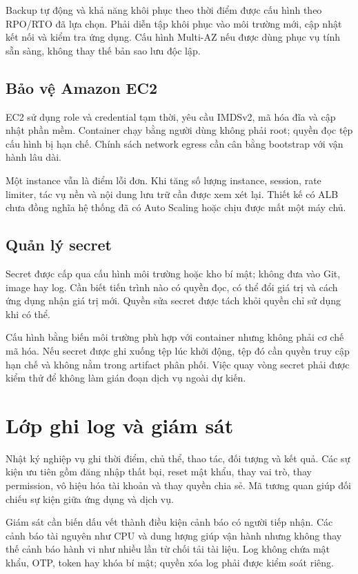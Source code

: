 Backup tự động và khả năng khôi phục theo thời điểm được cấu hình theo RPO/RTO đã lựa chọn. Phải diễn tập khôi phục vào môi trường mới, cập nhật kết nối và kiểm tra ứng dụng. Cấu hình Multi-AZ nếu được dùng phục vụ tính sẵn sàng, không thay thế bản sao lưu độc lập.
\subsection{Bảo vệ Amazon EC2}
EC2 sử dụng role và credential tạm thời, yêu cầu IMDSv2, mã hóa đĩa và cập nhật phần mềm. Container chạy bằng người dùng không phải root; quyền đọc tệp cấu hình bị hạn chế. Chính sách network egress cần cân bằng bootstrap với vận hành lâu dài.

Một instance vẫn là điểm lỗi đơn. Khi tăng số lượng instance, session, rate limiter, tác vụ nền và nội dung lưu trữ cần được xem xét lại. Thiết kế có ALB chưa đồng nghĩa hệ thống đã có Auto Scaling hoặc chịu được mất một máy chủ.
\subsection{Quản lý secret}
Secret được cấp qua cấu hình môi trường hoặc kho bí mật; không đưa vào Git, image hay log. Cần biết tiến trình nào có quyền đọc, có thể đổi giá trị và cách ứng dụng nhận giá trị mới. Quyền sửa secret được tách khỏi quyền chỉ sử dụng khi có thể.

Cấu hình bằng biến môi trường phù hợp với container nhưng không phải cơ chế mã hóa. Nếu secret được ghi xuống tệp lúc khởi động, tệp đó cần quyền truy cập hạn chế và không nằm trong artifact phân phối. Việc quay vòng secret phải được kiểm thử để không làm gián đoạn dịch vụ ngoài dự kiến.

\section{Lớp ghi log và giám sát}
Nhật ký nghiệp vụ ghi thời điểm, chủ thể, thao tác, đối tượng và kết quả. Các sự kiện ưu tiên gồm đăng nhập thất bại, reset mật khẩu, thay vai trò, thay permission, vô hiệu hóa tài khoản và thay quyền chia sẻ. Mã tương quan giúp đối chiếu sự kiện giữa ứng dụng và dịch vụ.

Giám sát cần biến dấu vết thành điều kiện cảnh báo có người tiếp nhận. Các cảnh báo tài nguyên như CPU và dung lượng giúp vận hành nhưng không thay thế cảnh báo hành vi như nhiều lần từ chối tải tài liệu. Log không chứa mật khẩu, OTP, token hay khóa bí mật; quyền xóa log phải được kiểm soát riêng.

